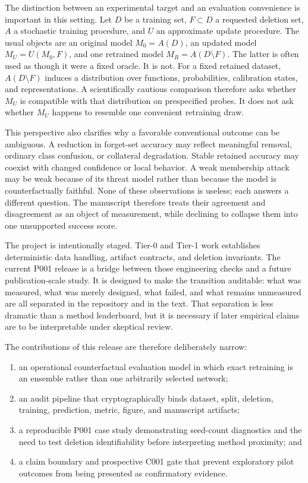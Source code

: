 The distinction between an experimental target and an evaluation convenience is important in
this setting. Let $D$ be a training set, $F\subset D$ a requested deletion set, $A$ a
stochastic training procedure, and $U$ an approximate update procedure. The usual objects are
an original model $M_0=A(D)$, an updated model $M_U=U(M_0,F)$, and one retrained model
$M_R=A(D\setminus F)$. The latter is often used as though it were a fixed oracle. It is not.
For a fixed retained dataset, $A(D\setminus F)$ induces a distribution over functions,
probabilities, calibration states, and representations. A scientifically cautious comparison
therefore asks whether $M_U$ is compatible with that distribution on prespecified probes. It
does not ask whether $M_U$ happens to resemble one convenient retraining draw.

This perspective also clarifies why a favorable conventional outcome can be ambiguous. A
reduction in forget-set accuracy may reflect meaningful removal, ordinary class confusion, or
collateral degradation. Stable retained accuracy may coexist with changed confidence or local
behavior. A weak membership attack may be weak because of its threat model rather than because
the model is counterfactually faithful. None of these observations is useless; each answers a
different question. The manuscript therefore treats their agreement and disagreement as an
object of measurement, while declining to collapse them into one unsupported success score.

The project is intentionally staged. Tier-0 and Tier-1 work establishes deterministic data
handling, artifact contracts, and deletion invariants. The current P001 release is a bridge
between those engineering checks and a future publication-scale study. It is designed to make
the transition auditable: what was measured, what was merely designed, what failed, and what
remains unmeasured are all separated in the repository and in the text. That separation is less
dramatic than a method leaderboard, but it is necessary if later empirical claims are to be
interpretable under skeptical review.

The contributions of this release are therefore deliberately narrow:
\begin{enumerate}
\item an operational counterfactual evaluation model in which exact retraining is an
ensemble rather than one arbitrarily selected network;
\item an audit pipeline that cryptographically binds dataset, split, deletion, training,
prediction, metric, figure, and manuscript artifacts;
\item a reproducible P001 case study demonstrating seed-count diagnostics and the need to
test deletion identifiability before interpreting method proximity; and
\item a claim boundary and prospective C001 gate that prevent exploratory pilot outcomes
from being presented as confirmatory evidence.
\end{enumerate}

